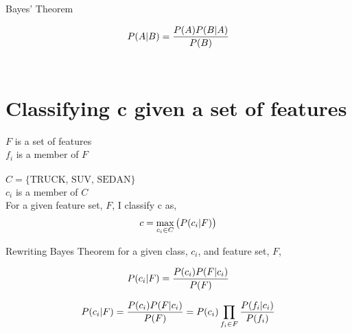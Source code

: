 \documentclass{article}
\begin{document}
%
%


\begin{center} Bayes' Theorem \end{center}

\begin{equation} %
		\nonumber \bayes{A}{B}
		\label{Bayes' Theorem}
\end{equation} \\


%
%

\section{Classifying c given a set of features}


%
%

$F$ is a set of features  \\
$f_i$ is a member of $F$ \\ \\
$C = \{ \text{TRUCK, SUV, SEDAN} \} $ \\ 
$c_i$ is a member of $C$ \\

%
%

For a given feature set, $F$, I classify c as,
\begin{equation}
	\nonumber
	c =
 	\max_{c_i \in C} \big( P(c_i|F) \big)
\end{equation}

%
%

Rewriting Bayes Theorem for a given class, $c_i$, and feature set, $F$,

\begin{equation}
	\nonumber P(c_i|F) = \frac{P(c_i) P(F|c_i)}{P(F)}
\end{equation}


\begin{equation}
	\nonumber P(c_i|F) = 
	\frac{P(c_i) P(F|c_i)}{P(F)} =
	P(c_i) \prod\limits_{f_i \in F} \frac{ P(f_i|c_i)}{P(f_i)}
\end{equation}
\end{document}
